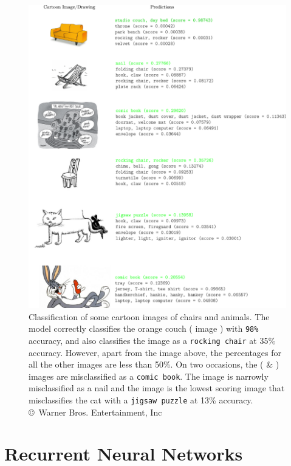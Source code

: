 \documentclass[report, 11pt, oneside]{dissertation}
\begin{document}
\begin{figure}[!htb]
	\centering
	\includegraphics[scale=0.55]{figure_16.pdf}
	\caption[ImageNet classification on Cartoons.]{Classification of some cartoon images of chairs and animals. The model correctly classifies the orange couch ( image \citep{openclipart_vectors:2013}) with \texttt{98\%} accuracy, and also classifies the  image \citep{britton:2017} as a \texttt{rocking chair} at 35\% accuracy. However, apart from the  image above, the percentages for all the other images are less than 50\%. On two occasions, the ( \citep{shiplett:2013} \&  \citep{warner_bros:2013}) images are misclassified as a \texttt{comic book}. The  image \citep{rayner} is narrowly misclassified as a nail and the  \citep{belortaja:2009} image is the lowest scoring image that misclassifies the cat with a \texttt{jigsaw puzzle} at 13\% accuracy. \copyright \ Warner Bros. Entertainment, Inc}
	\label{fig:inception}
\end{figure}


\section{Recurrent Neural Networks}
\end{document}
